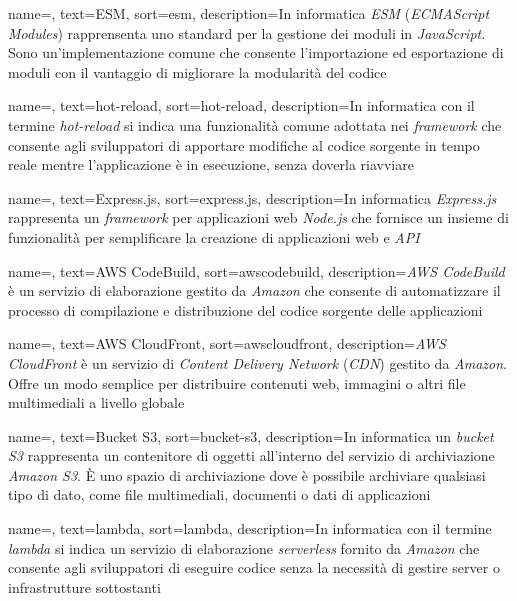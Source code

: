  {
    name=,
    text=ESM,
    sort=esm,
    description={In informatica \emph{ESM} (\emph{ECMAScript Modules}) rapprensenta uno standard per la gestione dei moduli in \emph{JavaScript}. Sono un'implementazione comune che consente l'importazione
    ed esportazione di moduli con il vantaggio di migliorare la modularità del codice}
}

 {
    name=,
    text=hot-reload,
    sort=hot-reload,
    description={In informatica con il termine \emph{hot-reload} si indica una funzionalità comune adottata nei \emph{framework} che consente agli sviluppatori di apportare modifiche al codice sorgente
    in tempo reale mentre l'applicazione è in esecuzione, senza doverla riavviare}
}

 {
    name=,
    text=Express.js,
    sort=express.js,
    description={In informatica \emph{Express.js} rappresenta un \emph{framework} per applicazioni web \emph{Node.js} che fornisce un insieme di funzionalità per semplificare la creazione di applicazioni web e \emph{API}}
}


 {
    name=,
    text=AWS CodeBuild,
    sort=awscodebuild,
    description={\emph{AWS CodeBuild} è un servizio di elaborazione gestito da \emph{Amazon} che consente di automatizzare il processo di compilazione e distribuzione del codice sorgente delle applicazioni}
}

 {
    name=,
    text=AWS CloudFront,
    sort=awscloudfront,
    description={\emph{AWS CloudFront} è un servizio di \emph{Content Delivery Network} (\emph{CDN}) gestito da \emph{Amazon}. Offre un modo semplice per distribuire contenuti web, immagini o altri file multimediali a livello globale}
}

 {
    name=,
    text=Bucket S3,
    sort=bucket-s3,
    description={In informatica un \emph{bucket S3} rappresenta un contenitore di oggetti all'interno del servizio di archiviazione \emph{Amazon S3}. È uno spazio di archiviazione dove è possibile archiviare qualsiasi tipo di dato, come file multimediali, documenti o dati di applicazioni}
}

 {
    name=,
    text=lambda,
    sort=lambda,
    description={In informatica con il termine \emph{lambda} si indica un servizio di elaborazione \emph{serverless} fornito da \emph{Amazon} che consente agli sviluppatori di eseguire codice senza la necessità di gestire server o infrastrutture sottostanti}
}

